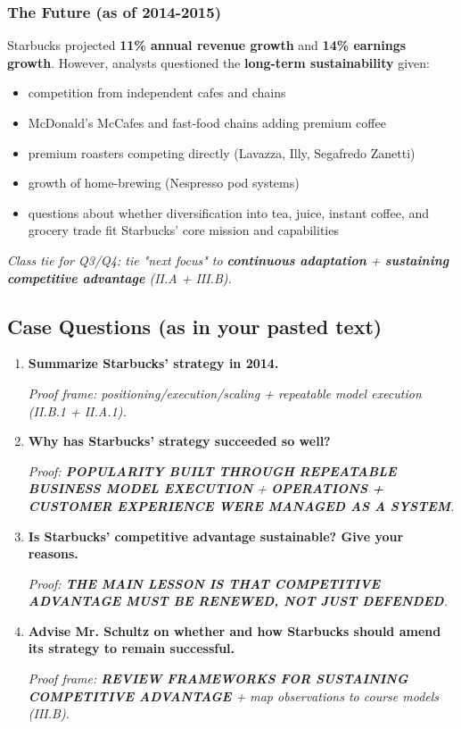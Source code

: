 \documentclass[10pt,a4paper]{article}
\newcommand{\handnote}[1]{%
  \par\noindent\footnotesize\color{notepink}\textit{#1}\par%
  \vspace{0.25em}%
}
\newcommand{\hlpink}[1]{\colorbox{pink!25}{\textbf{#1}}}
\begin{document}
\subsubsection*{\color{eublue}The Future (as of 2014-2015)}
Starbucks projected \hlpink{11\% annual revenue growth} and \hlpink{14\% earnings growth}. However, analysts questioned the \hlpink{long-term sustainability} given:
\begin{itemize}
  \item competition from independent cafes and chains
  \item McDonald's McCafes and fast-food chains adding premium coffee
  \item premium roasters competing directly (Lavazza, Illy, Segafredo Zanetti)
  \item growth of home-brewing (Nespresso pod systems)
  \item questions about whether diversification into tea, juice, instant coffee, and grocery trade fit Starbucks' core mission and capabilities
\end{itemize}

\handnote{Class tie for Q3/Q4: tie "next focus" to \hlpink{continuous adaptation} + \hlpink{sustaining competitive advantage} (II.A + III.B).}

\subsection*{\color{eublue}Case Questions (as in your pasted text)}
\begin{enumerate}
  \item \hlpink{Summarize Starbucks' strategy in 2014.} \handnote{Proof frame: positioning/execution/scaling + repeatable model execution (II.B.1 + II.A.1).}
  \item \hlpink{Why has Starbucks' strategy succeeded so well?} \handnote{Proof: \hlpink{POPULARITY BUILT THROUGH REPEATABLE BUSINESS MODEL EXECUTION} + \hlpink{OPERATIONS + CUSTOMER EXPERIENCE WERE MANAGED AS A SYSTEM}.}
  \item \hlpink{Is Starbucks' competitive advantage sustainable? Give your reasons.} \handnote{Proof: \hlpink{THE MAIN LESSON IS THAT COMPETITIVE ADVANTAGE MUST BE RENEWED, NOT JUST DEFENDED}.}
  \item \hlpink{Advise Mr. Schultz on whether and how Starbucks should amend its strategy to remain successful.} \handnote{Proof frame: \hlpink{REVIEW FRAMEWORKS FOR SUSTAINING COMPETITIVE ADVANTAGE} + map observations to course models (III.B).}
\end{enumerate}
\end{document}
